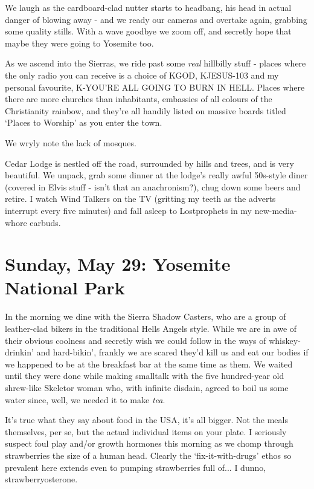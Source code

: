\documentclass[a5paper,titlepage,11pt,draft]{book}
\begin{document}
We laugh as the cardboard-clad nutter starts to headbang, his head in actual danger of blowing away - and we ready our cameras and overtake again, grabbing some quality stills.  With a wave goodbye we zoom off, and secretly hope that maybe they were going to Yosemite too.

As we ascend into the Sierras, we ride past some \emph{real} hillbilly stuff - places where the only radio you can receive is a choice of KGOD, KJESUS-103 and my personal favourite, K-YOU'RE ALL GOING TO BURN IN HELL.  Places where there are more churches than inhabitants, embassies of all colours of the Christianity rainbow, and they're all handily listed on massive boards titled `Places to Worship' as you enter the town.

We wryly note the lack of mosques.

Cedar Lodge is nestled off the road, surrounded by hills and trees, and is very beautiful.  We unpack, grab some dinner at the lodge's really awful 50s-style diner (covered in Elvis stuff - isn't that an anachronism?), chug down some beers and retire.  I watch Wind Talkers on the TV (gritting my teeth as the adverts interrupt every five minutes) and fall asleep to Lostprophets in my new-media-whore earbuds.

\chapter[Yosemite National Park]{Sunday, May 29: Yosemite National Park}
In the morning we dine with the Sierra Shadow Casters, who are a group of leather-clad bikers in the traditional Hells Angels style.  While we are in awe of their obvious coolness and secretly wish we could follow in the ways of whiskey-drinkin' and hard-bikin', frankly we are scared they'd kill us and eat our bodies if we happened to be at the breakfast bar at the same time as them.  We waited until they were done while making smalltalk with the five hundred-year old shrew-like Skeletor woman who, with infinite disdain, agreed to boil us some water since, well, we needed it to make \emph{tea}.

It's true what they say about food in the USA, it's all bigger.  Not the meals themselves, per se, but the actual individual items on your plate. I seriously suspect foul play and/or growth hormones this morning as we chomp through strawberries the size of a human head.  Clearly the `fix-it-with-drugs' ethos so prevalent here extends even to pumping strawberries full of... I dunno, strawberryosterone.
\end{document}
